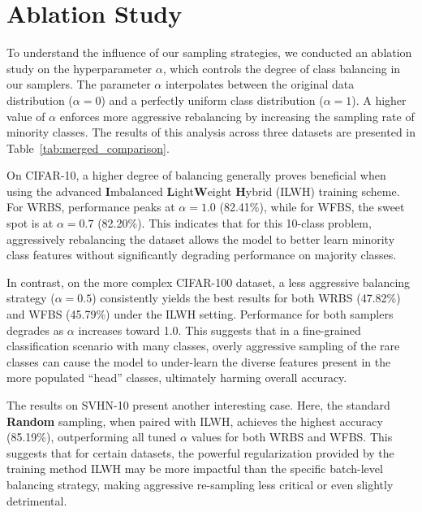 \section{Ablation Study} \label{sec:ablation}

To understand the influence of our sampling strategies, we conducted an ablation study on the hyperparameter \(\alpha\), which controls the degree of class balancing in our samplers. The parameter \(\alpha\) interpolates between the original data distribution (\(\alpha=0\)) and a perfectly uniform class distribution (\(\alpha=1\)). A higher value of \(\alpha\) enforces more aggressive rebalancing by increasing the sampling rate of minority classes. The results of this analysis across three datasets are presented in Table~\ref{tab:merged_comparison}. 

On CIFAR-10, a higher degree of balancing generally proves beneficial when using the advanced \textbf{I}mbalanced \textbf{L}ight\textbf{W}eight \textbf{H}ybrid (ILWH) training scheme. For WRBS, performance peaks at \(\alpha=1.0\) (82.41\%), while for WFBS, the sweet spot is at \(\alpha=0.7\) (82.20\%). This indicates that for this 10-class problem, aggressively rebalancing the dataset allows the model to better learn minority class features without significantly degrading performance on majority classes.

In contrast, on the more complex CIFAR-100 dataset, a less aggressive balancing strategy (\(\alpha=0.5\)) consistently yields the best results for both WRBS (47.82\%) and WFBS (45.79\%) under the ILWH setting. Performance for both samplers degrades as \(\alpha\) increases toward 1.0. This suggests that in a fine-grained classification scenario with many classes, overly aggressive sampling of the rare classes can cause the model to under-learn the diverse features present in the more populated ``head'' classes, ultimately harming overall accuracy.

The results on SVHN-10 present another interesting case. Here, the standard \textbf{Random} sampling, when paired with ILWH, achieves the highest accuracy (85.19\%), outperforming all tuned \(\alpha\) values for both WRBS and WFBS. This suggests that for certain datasets, the powerful regularization provided by the training method ILWH may be more impactful than the specific batch-level balancing strategy, making aggressive re-sampling less critical or even slightly detrimental.


